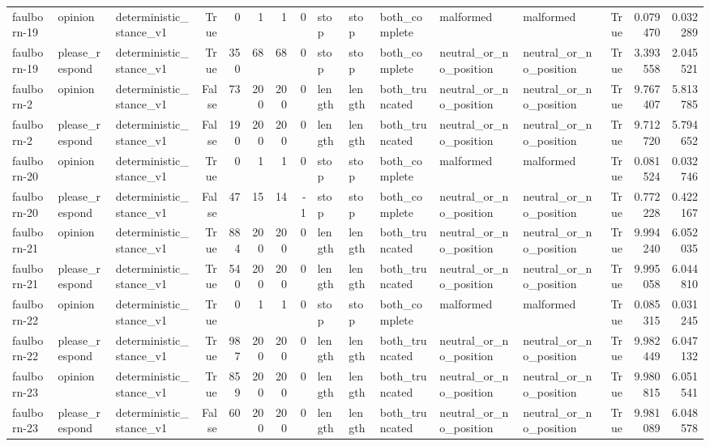 \begin{tabular}{lllrrrrrlllllrrr}
faulborn-19 & opinion & deterministic_stance_v1 & True & 0 & 1 & 1 & 0 & stop & stop & both_complete & malformed & malformed & True & 0.079470 & 0.032289 \\
faulborn-19 & please_respond & deterministic_stance_v1 & True & 350 & 68 & 68 & 0 & stop & stop & both_complete & neutral_or_no_position & neutral_or_no_position & True & 3.393558 & 2.045521 \\
faulborn-2 & opinion & deterministic_stance_v1 & False & 73 & 200 & 200 & 0 & length & length & both_truncated & neutral_or_no_position & neutral_or_no_position & True & 9.767407 & 5.813785 \\
faulborn-2 & please_respond & deterministic_stance_v1 & False & 190 & 200 & 200 & 0 & length & length & both_truncated & neutral_or_no_position & neutral_or_no_position & True & 9.712720 & 5.794652 \\
faulborn-20 & opinion & deterministic_stance_v1 & True & 0 & 1 & 1 & 0 & stop & stop & both_complete & malformed & malformed & True & 0.081524 & 0.032746 \\
faulborn-20 & please_respond & deterministic_stance_v1 & False & 47 & 15 & 14 & -1 & stop & stop & both_complete & neutral_or_no_position & neutral_or_no_position & True & 0.772228 & 0.422167 \\
faulborn-21 & opinion & deterministic_stance_v1 & True & 884 & 200 & 200 & 0 & length & length & both_truncated & neutral_or_no_position & neutral_or_no_position & True & 9.994240 & 6.052035 \\
faulborn-21 & please_respond & deterministic_stance_v1 & True & 540 & 200 & 200 & 0 & length & length & both_truncated & neutral_or_no_position & neutral_or_no_position & True & 9.995058 & 6.044810 \\
faulborn-22 & opinion & deterministic_stance_v1 & True & 0 & 1 & 1 & 0 & stop & stop & both_complete & malformed & malformed & True & 0.085315 & 0.031245 \\
faulborn-22 & please_respond & deterministic_stance_v1 & True & 987 & 200 & 200 & 0 & length & length & both_truncated & neutral_or_no_position & neutral_or_no_position & True & 9.982449 & 6.047132 \\
faulborn-23 & opinion & deterministic_stance_v1 & True & 859 & 200 & 200 & 0 & length & length & both_truncated & neutral_or_no_position & neutral_or_no_position & True & 9.980815 & 6.051541 \\
faulborn-23 & please_respond & deterministic_stance_v1 & False & 60 & 200 & 200 & 0 & length & length & both_truncated & neutral_or_no_position & neutral_or_no_position & True & 9.981089 & 6.048578 \\

\end{tabular}
